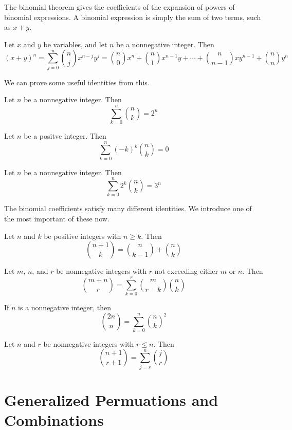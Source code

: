 \documentclass[../discrete.tex]{subfiles}
\begin{document}
The binomial theorem gives the coefficients of the expansion of powers of binomial expressions.
A binomial expression is simply the sum of two terms, such as $x+y$.
\begin{theorem}
    Let $x$ and $y$ be variables, and let $n$ be a nonnegative integer. Then 
    \[(x+y)^n=\sum_{j=0}^n\binom{n}{j}x^{n-j}y^j = \binom{n}{0}x^n+\binom{n}{1}x^{n-1}y+\cdots+\binom{n}{n-1}xy^{n-1}+\binom{n}{n}y^n\]
\end{theorem}

We can prove some useful identities from this.
\begin{corollary}
    Let $n$ be a nonnegative integer. Then 
    \[\sum_{k=0}^n\binom{n}{k}=2^n\]
\end{corollary}

\begin{corollary}
    Let $n$ be a positve integer. Then 
    \[\sum_{k=0}^{n}(-k)^k\binom{n}{k}=0\]
\end{corollary}

\begin{corollary}
    Let $n$ be a nonnegative integer. Then 
    \[\sum_{k=0}^n 2^k\binom{n}{k}=3^n\]
\end{corollary}

The binomial coefficients satisfy many different identities. We introduce one of the most important of these now.
\begin{theorem}
    Let $n$ and $k$ be positive integers with $n\geq k$. Then 
    \[\binom{n+1}{k}=\binom{n}{k-1}+\binom{n}{k}\]
\end{theorem}

\begin{theorem}
    Let $m$, $n$, and $r$ be nonnegative integers with $r$ not exceeding either $m$ or $n$. Then 
    \[\binom{m+n}{r}=\sum_{k=0}^r \binom{m}{r-k}\binom{n}{k}\]
\end{theorem}

\begin{corollary}
    If $n$ is a nonnegative integer, then 
    \[\binom{2n}{n}=\sum_{k=0}^n \binom{n}{k}^2\]
\end{corollary}

\begin{theorem}
    Let $n$ and $r$ be nonnegative integers with $r\leq n$. Then 
    \[\binom{n+1}{r+1}=\sum_{j=r}^n\binom{j}{r}\]
\end{theorem}

\section{Generalized Permuations and Combinations}
\pagebreak 
\end{document}
